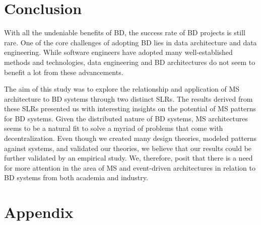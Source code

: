 \documentclass{bmcart}
\begin{document}


 
\section{Conclusion}
With all the undeniable benefits of BD, the success rate of BD projects is still rare. One of the core challenges of adopting BD lies in data architecture and data engineering. While software engineers have adopted many well-established methods and technologies, data engineering and BD architectures do not seem to benefit a lot from these advancements. 

The aim of this study was to explore the relationship and application of MS architecture to BD systems through two distinct SLRs. The results derived from these SLRs presented us with interesting insights on the potential of MS patterns for BD systems. Given the distributed nature of BD systems, MS architectures seems to be a natural fit to solve a myriad of problems that come with decentralization. Even though we created many design theories, modeled patterns against systems, and validated our theories, we believe that our results could be further validated by an empirical study. We, therefore, posit that there is a need for more attention in the area of MS and event-driven architectures in relation to BD systems from both academia and industry. 

\section{Appendix}

\end{document}
